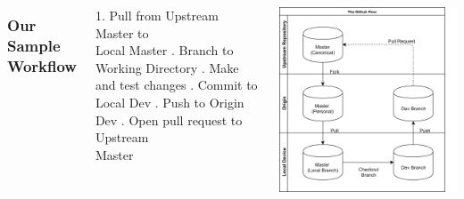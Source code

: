 \documentclass[unknownkeysallowed]{beamer}
\begin{document}
\begin{frame}
    \vspace{1.01cm}
	\begin{columns}
		\column{2.5in}
    \frametitle{Our Sample Workflow}
        1. Pull from Upstream Master to \\
        Local Master \linebreak{}. Branch to Working Directory \linebreak{}. Make and test changes \linebreak{}. Commit to Local Dev \linebreak{}. Push to Origin Dev \linebreak{}. Open pull request to Upstream \\
        Master
	\column{2.25in}
	\begin{center}
	\includegraphics[width = .95\linewidth]{assets/gitflow6}
	\end{center}
	\end{columns}
    \vspace{1cm}
\end{frame}
\end{document}
